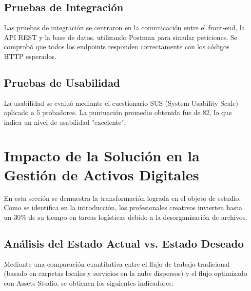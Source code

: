 \subsection{Pruebas de Integración}

Las pruebas de integración se centraron en la comunicación entre el front-end, la API REST y la base de datos, utilizando Postman para simular peticiones. Se comprobó que todos los endpoints responden correctamente con los códigos HTTP esperados.

\subsection{Pruebas de Usabilidad}

La usabilidad se evaluó mediante el cuestionario SUS (System Usability Scale) aplicado a 5 probadores. La puntuación promedio obtenida fue de 82, lo que indica un nivel de usabilidad "excelente".

\begin{figure}[H]
    \centering
    {}
\end{figure}

\section{Impacto de la Solución en la Gestión de Activos Digitales}
\label{sec:III_2}

En esta sección se demuestra la transformación lograda en el objeto de estudio. Como se identifica en la introducción, los profesionales creativos invierten hasta un 30\% de su tiempo en tareas logísticas debido a la desorganización de archivos.

\subsection{Análisis del Estado Actual vs. Estado Deseado}
Mediante una comparación cuantitativa entre el flujo de trabajo tradicional (basado en carpetas locales y servicios en la nube dispersos) y el flujo optimizado con Assets Studio, se obtienen los siguientes indicadores:

